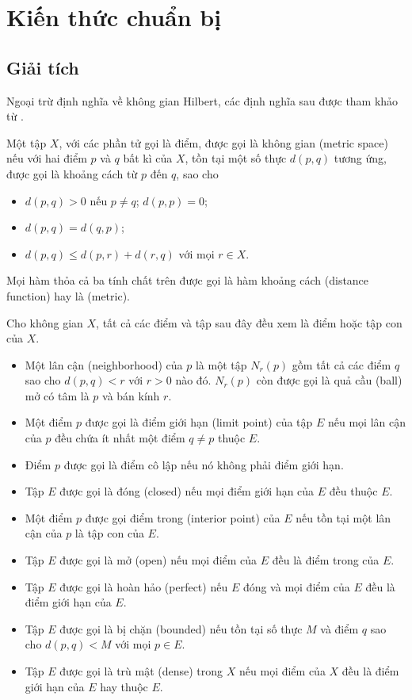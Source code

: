 \section{Kiến thức chuẩn bị}

\subsection{Giải tích}

Ngoại trừ định nghĩa về không gian Hilbert, các định nghĩa sau được tham khảo
từ \cite[chương~2, 3 và~7]{Rudin1976principles}.

\begin{defn}
  Một tập $X$, với các phần tử gọi là điểm, được gọi là không gian 
  (metric space) nếu với hai điểm $p$ và $q$ bất kì của $X$, tồn tại một số
  thực $d(p, q)$ tương ứng, được gọi là khoảng cách từ $p$ đến $q$, sao cho
  \begin{itemize}
    \item $d(p, q) > 0$ nếu $p \ne q$; $d(p, p) = 0$;
    \item $d(p, q) = d(q, p)$;
    \item $d(p, q) \le d(p, r) + d(r, q)$ với mọi $r \in X$.
  \end{itemize} Mọi hàm thỏa cả ba tính chất trên được gọi là hàm khoảng cách
  (distance function) hay là  (metric).
\end{defn}

\begin{defn}
  Cho không gian  $X$, tất cả các điểm và tập sau đây đều xem là
  điểm hoặc tập con của $X$. \begin{itemize}
    \item Một lân cận (neighborhood) của $p$ là một tập $N_r(p)$ gồm tất cả các
      điểm $q$ sao cho $d(p, q) < r$ với $r > 0$ nào đó. $N_r(p)$ còn được gọi
      là quả cầu (ball) mở có tâm là $p$ và bán kính $r$.
    \item Một điểm $p$ được gọi là điểm giới hạn (limit point) của tập $E$ nếu
      mọi lân cận của $p$ đều chứa ít nhất một điểm $q \ne p$ thuộc $E$.
    \item Điểm $p$ được gọi là điểm cô lập nếu nó không phải điểm giới hạn.
    \item Tập $E$ được gọi là đóng (closed) nếu mọi điểm giới hạn của $E$ đều
      thuộc $E$.
    \item Một điểm $p$ được gọi điểm trong (interior point) của $E$ nếu tồn tại
      một lân cận của $p$ là tập con của $E$.
    \item Tập $E$ được gọi là mở (open) nếu mọi điểm của $E$ đều là điểm trong
      của $E$.
    \item Tập $E$ được gọi là hoàn hảo (perfect) nếu $E$ đóng và mọi điểm của
      $E$ đều là điểm giới hạn của $E$.
    \item Tập $E$ được gọi là bị chặn (bounded) nếu tồn tại số thực $M$ và điểm
      $q$ sao cho $d(p, q) < M$ với mọi $p \in E$.
    \item Tập $E$ được gọi là trù mật (dense) trong $X$ nếu mọi điểm của $X$
      đều là điểm giới hạn của $E$ hay thuộc $E$.
  \end{itemize}
\end{defn}

